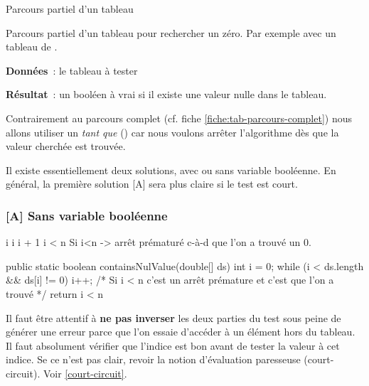 \begin{Fiche}{Parcours partiel d’un tableau}
\label{fiche:tab-parcours-partiel}


	Parcours partiel d'un tableau pour rechercher un zéro. Par exemple avec un
	tableau de .

	
	\textbf{Données}~: le tableau à tester
		
	\textbf{Résultat}~: 
		un booléen à vrai si il existe une valeur nulle dans le tableau.
	
	\begin{center}	
	\end{center}


	Contrairement au parcours complet (cf. fiche
	\vref{fiche:tab-parcours-complet}) nous allons utiliser un \emph{tant que}
	() car nous voulons arrêter l'algorithme dès que la valeur
	cherchée est trouvée.
	
	Il existe essentiellement deux solutions, avec ou sans variable booléenne.
	En général, la première solution [A] sera plus claire si le test est court.

	\subsubsection*{[A] Sans variable booléenne}
	
		\begin{pseudocode}
				\Let i 
					\Let i \Gets i + 1
				\EndWhile
				\Return i < n \RComment Si i<n -> arrêt prématuré 
					\Let\RComment c-à-d que l'on a trouvé un 0.
			\EndAlgo
		\end{pseudocode}

		\begin{java}
public static boolean containsNulValue(double[] ds){
	int i = 0;
	while (i < ds.length && ds[i] != 0){
		i++;
	}
	/* Si i < n c'est un arrêt prémature et c'est que l'on a trouvé */
	return i < n
}
		\end{java}
	
		Il faut être attentif à \textbf{ne pas inverser} les deux parties du
		test sous peine de générer une erreur parce que l'on essaie d'accéder
		à un élément hors du tableau.  Il faut absolument vérifier que l’indice
		est bon avant de tester la valeur à cet indice. Se ce n'est pas clair,
		revoir la notion d'évaluation paresseuse (court-circuit). Voir
		\vref{court-circuit}.
		


\end{Fiche}
